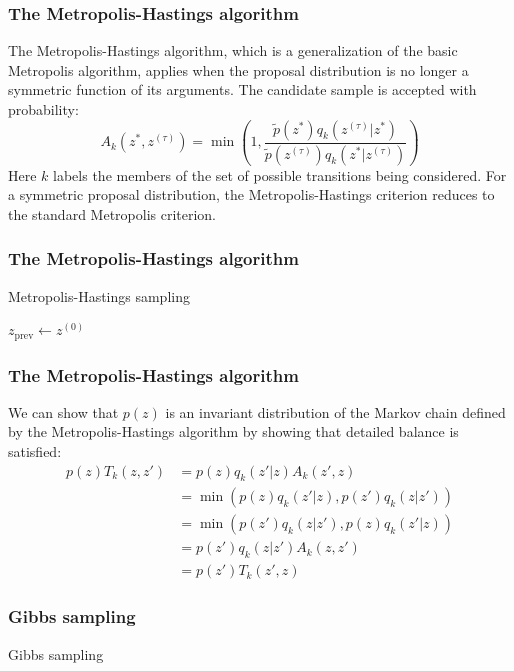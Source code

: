 \documentclass{beamer}
\begin{document}
\begin{frame}
    \frametitle{The Metropolis-Hastings algorithm}
    The Metropolis-Hastings algorithm, which is a generalization of the basic Metropolis algorithm, applies when the proposal distribution is no longer a symmetric function of its arguments. The candidate sample is accepted with probability:
    \begin{equation*}
        A_{k}(z^{*},z^{(\tau)})=\min(1,\frac{\tilde{p}(z^{*})q_{k}(z^{(\tau)}|z^{*})}{\tilde{p}(z^{(\tau)})q_{k}(z^{*}|z^{(\tau)})})
    \end{equation*}
    Here $k$ labels the members of the set of possible transitions being considered. For a symmetric proposal distribution, the Metropolis-Hastings criterion reduces to the standard Metropolis criterion.
\end{frame}

\begin{frame}
    \frametitle{The Metropolis-Hastings algorithm}
    \begin{algorithm}[H]
        \caption{Metropolis-Hastings sampling}
        $z_{\mathrm{prev}}\gets{}z^{(0)}$\;
        \;
    \end{algorithm}
\end{frame}

\begin{frame}
    \frametitle{The Metropolis-Hastings algorithm}
    We can show that $p(z)$ is an invariant distribution of the Markov chain defined by the Metropolis-Hastings algorithm by showing that detailed balance is satisfied:
    \begin{align*}
        p(z)T_{k}(z,z')&=p(z)q_{k}(z'|z)A_{k}(z',z) \\
        &=\min(p(z)q_{k}(z'|z),p(z')q_{k}(z|z')) \\
        &=\min(p(z')q_{k}(z|z'),p(z)q_{k}(z'|z)) \\
        &=p(z')q_{k}(z|z')A_{k}(z,z') \\
        &=p(z')T_{k}(z',z)
    \end{align*}
\end{frame}

\begin{frame}
    \frametitle{Gibbs sampling}
    \begin{algorithm}[H]
        \caption{Gibbs sampling}
        \;
    \end{algorithm}
\end{frame}
\end{document}

